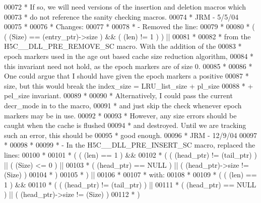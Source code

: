 \begin{DoxyCode}
00072 \textcolor{comment}{ * If so, we will need versions of the insertion and deletion macros which}
00073 \textcolor{comment}{ * do not reference the sanity checking macros.}
00074 \textcolor{comment}{ *                          JRM - 5/5/04}
00075 \textcolor{comment}{ *}
00076 \textcolor{comment}{ * Changes:}
00077 \textcolor{comment}{ *}
00078 \textcolor{comment}{ *  - Removed the line:}
00079 \textcolor{comment}{ *}
00080 \textcolor{comment}{ *        ( ( (Size) == (entry\_ptr)->size ) && ( (len) != 1 ) ) ||}
00081 \textcolor{comment}{ *}
00082 \textcolor{comment}{ *    from the H5C\_\_DLL\_PRE\_REMOVE\_SC macro.  With the addition of the}
00083 \textcolor{comment}{ *    epoch markers used in the age out based cache size reduction algorithm,}
00084 \textcolor{comment}{ *    this invariant need not hold, as the epoch markers are of size 0.}
00085 \textcolor{comment}{ *}
00086 \textcolor{comment}{ *    One could argue that I should have given the epoch markers a positive}
00087 \textcolor{comment}{ *    size, but this would break the index\_size = LRU\_list\_size + pl\_size}
00088 \textcolor{comment}{ *    + pel\_size invariant.}
00089 \textcolor{comment}{ *}
00090 \textcolor{comment}{ *    Alternatively, I could pass the current decr\_mode in to the macro,}
00091 \textcolor{comment}{ *    and just skip the check whenever epoch markers may be in use.}
00092 \textcolor{comment}{ *}
00093 \textcolor{comment}{ *    However, any size errors should be caught when the cache is flushed}
00094 \textcolor{comment}{ *    and destroyed.  Until we are tracking such an error, this should be}
00095 \textcolor{comment}{ *    good enough.}
00096 \textcolor{comment}{ *                                                     JRM - 12/9/04}
00097 \textcolor{comment}{ *}
00098 \textcolor{comment}{ *}
00099 \textcolor{comment}{ *  - In the H5C\_\_DLL\_PRE\_INSERT\_SC macro, replaced the lines:}
00100 \textcolor{comment}{ *}
00101 \textcolor{comment}{ *    ( ( (len) == 1 ) &&}
00102 \textcolor{comment}{ *      ( ( (head\_ptr) != (tail\_ptr) ) || ( (Size) <= 0 ) ||}
00103 \textcolor{comment}{ *        ( (head\_ptr) == NULL ) || ( (head\_ptr)->size != (Size) )}
00104 \textcolor{comment}{ *      )}
00105 \textcolor{comment}{ *    ) ||}
00106 \textcolor{comment}{ *}
00107 \textcolor{comment}{ *    with:}
00108 \textcolor{comment}{ *}
00109 \textcolor{comment}{ *    ( ( (len) == 1 ) &&}
00110 \textcolor{comment}{ *      ( ( (head\_ptr) != (tail\_ptr) ) ||}
00111 \textcolor{comment}{ *        ( (head\_ptr) == NULL ) || ( (head\_ptr)->size != (Size) )}
00112 \textcolor{comment}{ *      )}

\end{DoxyCode}
